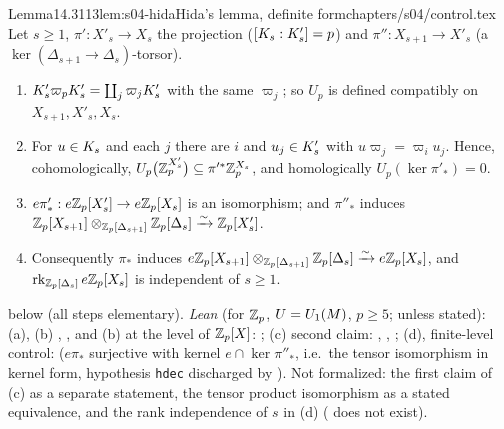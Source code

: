 \begin{quoted}{Lemma}{14.3}{113}{lem:s04-hida}{Hida's lemma, definite form}{chapters/s04/control.tex}\label{rpt:lem:s04-hida}
Let $s\ge1$, $\pi':X'_s\to X_s$ the projection ($[K_{s}:K'_{s}]=p$) and $\pi'':X_{s+1}\to X'_s$ (a $\ker(\Delta_{s+1}\to\Delta_s)$-torsor).
\begin{enumerate}[label=(\alph*)]
\item $K'_{s}\varpi_pK'_{s}=\coprod_j\varpi_jK'_{s}$ with the same $\varpi_j$; so $U_p$ is defined compatibly on $X_{s+1},X'_s,X_s$.
\item For $u\in K_{s}$ and each $j$ there are $i$ and $u_j\in K'_{s}$ with $u\varpi_j=\varpi_iu_j$. Hence, cohomologically,
  $U_p\big(\mathbb{Z}_p^{X'_s}\big)\subseteq\pi'^*\mathbb{Z}_p^{X_s}$, and homologically $U_p(\ker\pi'_*)=0$.
\item $e\pi'_*:e\mathbb{Z}_p[X'_s]\to e\mathbb{Z}_p[X_s]$ is an isomorphism; and $\pi''_*$ induces $\mathbb{Z}_p[X_{s+1}]\otimes_{\mathbb{Z}_p[\Delta_{s+1}]}\mathbb{Z}_p[\Delta_s]
  \xrightarrow{\sim}\mathbb{Z}_p[X'_s]$.
\item Consequently $\pi_*$ induces $e\mathbb{Z}_p[X_{s+1}]\otimes_{\mathbb{Z}_p[\Delta_{s+1}]}\mathbb{Z}_p[\Delta_s]\xrightarrow{\sim}e\mathbb{Z}_p[X_s]$, and
  $\operatorname{rk}_{\mathbb{Z}_p[\Delta_s]}e\mathbb{Z}_p[X_s]$ is independent of $s\ge1$.
\end{enumerate}
\stproved{} below (all steps elementary). \emph{Lean} (for $\mathbb{Z}_p$, $U=U_1(M)$, $p\ge5$; \stformal{} unless stated): (a), (b)
, , and (b) at the level of $\mathbb{Z}_p[X]$:
; (c) second claim:
, , ; (d), finite-level
control:  ($e\pi_*$ surjective with kernel $e\cap\ker\pi''_*$, i.e.\ the tensor isomorphism in
kernel form, hypothesis \texttt{hdec} discharged by ). Not formalized: the first claim of (c) as a separate statement,
the tensor product isomorphism as a stated equivalence, and the rank independence of $s$ in (d) ( does not exist).
\end{quoted}
